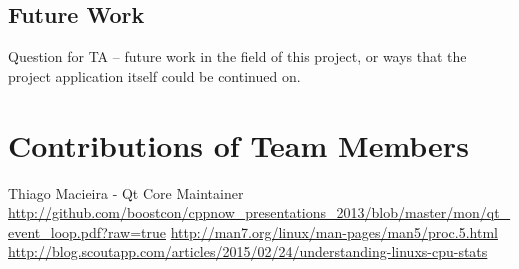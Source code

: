 \documentclass[12pt]{article}
\begin{document}
	\subsection{Future Work}
	Question for TA -- future work in the field of this project, or ways that the project application itself could be continued on.
	
	
	\setcounter{secnumdepth}{0}
	\section{Contributions of Team Members}
	
	\begin{thebibliography}{3}
	 Thiago Macieira - Qt Core Maintainer \url{http://github.com/boostcon/cppnow_presentations_2013/blob/master/mon/qt_event_loop.pdf?raw=true}
	\url{http://man7.org/linux/man-pages/man5/proc.5.html}
	\url{http://blog.scoutapp.com/articles/2015/02/24/understanding-linuxs-cpu-stats}
	\end{thebibliography}{}
\end{document}

